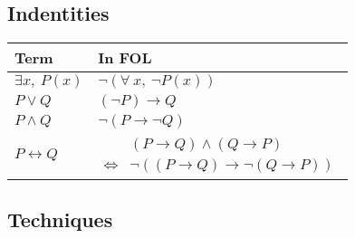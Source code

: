 \documentclass[11pt,a4paper]{article}
\begin{document}
\subsection{Indentities}

\begin{center}
\begin{tabular}{|l|l|}
\hline
\textbf{Term}&\textbf{In FOL}\\
\hline
$\exists x,\ P(x)$&$\neg(\forall\ x,\ \neg P(x))$\\
$P\vee Q$&$(\neg P)\to Q$\\
$P\wedge Q$&$\neg(P\to\neg Q)$\\
$P\leftrightarrow Q$&$\begin{array}{rl}&(P\to Q)\wedge(Q\to P)\\\Leftrightarrow&\neg((P\to Q)\to\neg(Q\to P))\end{array}$\\
\hline
\end{tabular}
\end{center}

\subsection{Techniques}

\end{document}
